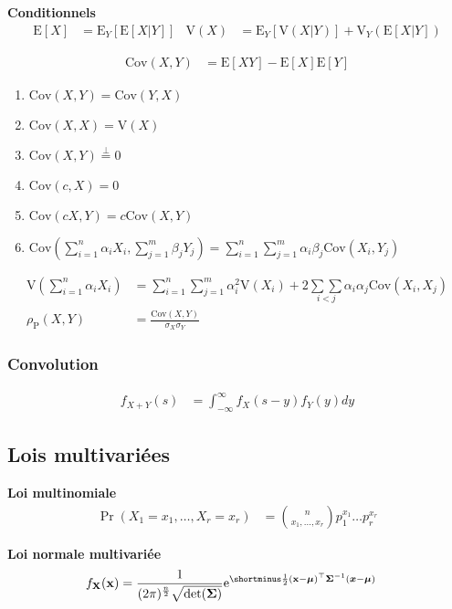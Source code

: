 \documentclass[10pt, french]{article}
\begin{document}
\begin{multicols*}{2}
\textbf{Conditionnels}
\begin{align*}
	\text{E}[X]	&=	\text{E}_{Y}[\text{E}[X|Y]]	&
	\text{V}(X)	&=	\text{E}_{Y}[\text{V}(X|Y)] + \text{V}_{Y}(\text{E}[X|Y])
\end{align*}

\begin{align*}
	\text{Cov}(X, Y)	
		&=	\text{E}[XY] - \text{E}[X] \text{E}[Y]	
\end{align*}

\begin{enumerate}
	\item $\text{Cov}(X, Y) = \text{Cov}(Y, X)$
	\item $\text{Cov}(X, X) = \text{V}(X)$
	\item $\text{Cov}(X, Y) \overset{\bot}{=} 0$
	\item $\text{Cov}(c, X) = 0$
	\item $\text{Cov}(cX, Y) = c\text{Cov}(X, Y)$
	\item $\text{Cov}(\sum_{i = 1}^{n}\alpha_{i} X_{i}, \sum_{j = 1}^{m}\beta_{j} Y_{j}) = \sum_{i = 1}^{n}\sum_{j = 1}^{m}\alpha_{i}\beta_{j}  \text{Cov}(X_{i}, Y_{j})$
\end{enumerate}

\begin{align*}
	\text{V}(\sum_{i = 1}^{n}\alpha_{i} X_{i}) 
		&= \sum_{i = 1}^{n}\sum_{j = 1}^{m}\alpha_{i}^{2}\text{V}(X_{i}) + 2 \underset{i < j}{\sum\sum} \alpha_{i}\alpha_{j} \text{Cov}(X_{i}, X_{j})	\\
	\rho_{\textrm{P}}(X, Y)
		&=	\frac{\text{Cov}(X, Y)}{\sigma_{X}\sigma_{Y}}
\end{align*}

\subsubsection*{Convolution}
\begin{align*}
	f_{X + Y}(s)	
		&=	\int_{-\infty}^{\infty} f_{X}(s - y) f_{Y}(y) dy	
\end{align*}

\subsection*{Lois multivariées}
	
\textbf{Loi multinomiale}
\begin{align*}
	\Pr(X_{1} = x_{1}, \dots, X_{r} = x_{r})
		&=	\binom{n}{x_{1}, \dots, x_{r}} p_{1}^{x_{1}} \dots p_{r}^{x_{r}}
\end{align*}

\textbf{Loi normale multivariée}
\begin{align*}
	f_{\matr{X}}(\matr{x}) 
		&= 	\frac{1}{(2 \pi)^{\frac{n}{2}} \sqrt{\text{det}(\bm{\Sigma})}} \e{\shortminus \frac{1}{2} (\matr{x} - \bm{\mu})^{\top} \bm{\Sigma}^{-1}(\bm{x} - \bm{\mu})}
\end{align*}

\end{multicols*}
\end{document}
